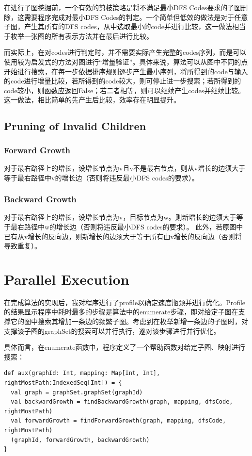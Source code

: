 \documentclass{article}
\begin{document}
在进行子图挖掘前，一个有效的剪枝策略是将不满足最小DFS Codes要求的子图删除，这需要程序完成对最小DFS Codes的判定。一个简单但低效的做法是对于任意子图，产生其所有的DFS codes，从中选取最小的code并进行比较，这一做法相当于枚举一张图的所有表示方法并在最后进行比较。

而实际上，在对codes进行判定时，并不需要实际产生完整的codes序列，而是可以使用较为启发式的方法对图进行“增量验证”。具体来说，算法可以从图中不同的点开始进行搜索，在每一步依据排序规则逐步产生最小序列，将所得到的code与输入的code进行增量比较，若所得到的code较大，则可停止进一步搜索；若所得到的code较小，则函数应返回False；若二者相等，则可以继续产生codes并继续比较。这一做法，相比简单的先产生后比较，效率存在明显提升。

\subsection{Pruning of Invalid Children}

\subsubsection{Forward Growth}

对于最右路径上的增长，设增长节点为v且v不是最右节点，则从v增长的边须大于等于最右路径中v的增长边（否则将违反最小DFS codes的要求）。

\subsubsection{Backward Growth}

对于最右路径上的增长，设增长节点为v，目标节点为w。则新增长的边须大于等于最右路径中w的增长边（否则将违反最小DFS codes的要求）。
此外，若原图中已有从v增长的反向边，则新增长的边须大于等于所有由v增长的反向边（否则将导致重复）。

\section{Parallel Execution}

在完成算法的实现后，我对程序进行了profile以确定速度瓶颈并进行优化。Profile的结果显示程序中耗时最多的步骤是算法中的enumerate步骤，即对给定子图在支撑它的图中搜索其增加一条边的频繁子图。考虑到在枚举新增一条边的子图时，对支撑该子图的graphSet的搜索可以并行执行，遂对该步骤进行并行优化。

具体而言，在enumerate函数中，程序定义了一个帮助函数对给定子图、映射进行搜索：
\begin{lstlisting}[style=mStyle]
def aux(graphId: Int, mapping: Map[Int, Int], rightMostPath:IndexedSeq[Int]) = {
  val graph = graphSet.graphSet(graphId)
  val backwardGrowth = findBackwardGrowth(graph, mapping, dfsCode, rightMostPath)
  val forwardGrowth = findForwardGrowth(graph, mapping, dfsCode, rightMostPath)
  (graphId, forwardGrowth, backwardGrowth)
}
\end{lstlisting}
\end{document}
